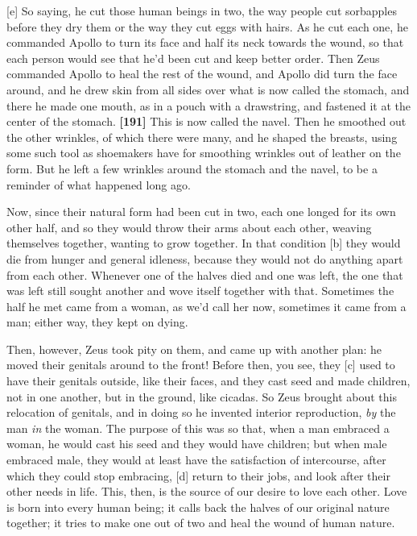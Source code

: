{[}e{]} So saying, he cut those human beings in two, the way people cut
sorbapples before they dry them or the way they cut eggs with hairs. As
he cut each one, he commanded Apollo to turn its face and half its neck
towards the wound, so that each person would see that he'd been cut and
keep better order. Then Zeus commanded Apollo to heal the rest of the
wound, and Apollo did turn the face around, and he drew skin from all
sides over what is now called the stomach, and there he made one mouth,
as in a pouch with a drawstring, and fastened it at the center of the
stomach. {\bf {[}191{]}} This is now called the navel. Then he smoothed
out the other wrinkles, of which there were many, and he shaped the
breasts, using some such tool as shoemakers have for smoothing wrinkles
out of leather on the form. But he left a few wrinkles around the
stomach and the navel, to be a reminder of what happened long ago.

Now, since their natural form had been cut in two, each one longed for
its own other half, and so they would throw their arms about each other,
weaving themselves together, wanting to grow together. In that condition
{[}b{]} they would die from hunger and general idleness, because they
would not do anything apart from each other. Whenever one of the halves
died and one was left, the one that was left still sought another and
wove itself together with that. Sometimes the half he met came from a
woman, as we'd call her now, sometimes it came from a man; either way,
they kept on dying.

Then, however, Zeus took pity on them, and came up with another plan: he
moved their genitals around to the front! Before then, you see, they
{[}c{]} used to have their genitals outside, like their faces, and they
cast seed and made children, not in one another, but in the ground, like
cicadas. So Zeus brought about this relocation of genitals, and in doing
so he invented interior reproduction, {\em by} the man {\em in} the
woman. The purpose of this was so that, when a man embraced a woman, he
would cast his seed and they would have children; but when male embraced
male, they would at least have the satisfaction of intercourse, after
which they could stop embracing, {[}d{]} return to their jobs, and look
after their other needs in life. This, then, is the source of our desire
to love each other. Love is born into every human being; it calls back
the halves of our original nature together; it tries to make one out of
two and heal the wound of human nature.

